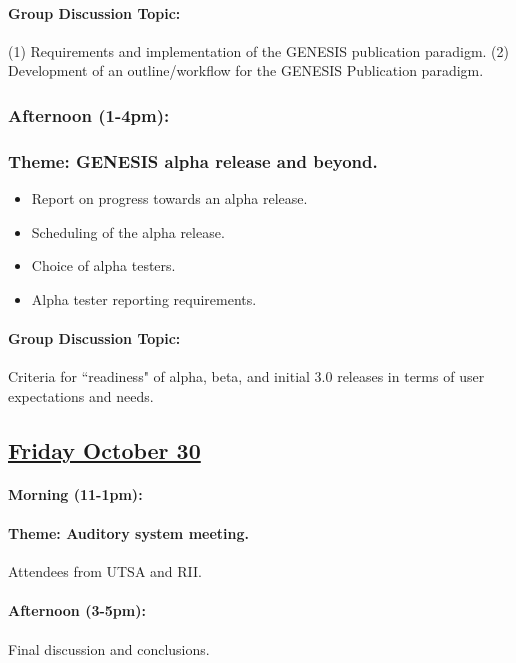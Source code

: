 \documentclass[12pt]{article}
\begin{document}
\paragraph{\bf Group Discussion Topic:} (1) Requirements and implementation of the GENESIS publication paradigm. (2) Development of an outline/workflow for the GENESIS Publication paradigm.

\subsubsection*{Afternoon (1-4pm):}
\subsubsection*{Theme: GENESIS alpha release and beyond.}
\begin{itemize}
   \item[]Report on progress towards an alpha release.
   \item[]Scheduling of the alpha release.
   \item[]Choice of alpha testers.
   \item[]Alpha tester reporting requirements.
\end{itemize}
\paragraph{\bf Group Discussion Topic:} Criteria for ``readiness" of alpha, beta, and initial 3.0 releases in terms of user expectations and needs.

\subsection*{\underline{Friday October 30}}
\paragraph{\bf Morning (11-1pm):}
\paragraph{\bf Theme: Auditory system meeting.}

Attendees from UTSA and RII.

\paragraph{\bf Afternoon (3-5pm):}
Final discussion and conclusions.
\end{document}
